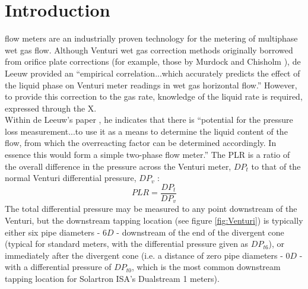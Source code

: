 \documentclass[journal]{IEEEtran}
\begin{document}






%



\section{Introduction}
 flow meters are an industrially proven technology for the metering of multiphase wet gas flow. Although Venturi wet gas correction methods originally borrowed from orifice plate corrections (for example, those by Murdock \cite{Murdock1962} and Chisholm \cite{Chisholm1977}), de Leeuw \cite{DeLeeuw1997} provided an ``empirical correlation...which accurately predicts the effect of the liquid phase on Venturi meter readings in wet gas horizontal flow.''  However, to provide this correction to the gas rate, knowledge of the liquid rate is required, expressed through the \acrfull{X}.\\

Within de Leeuw's paper \cite{DeLeeuw1997}, he indicates that there is ``potential for the pressure loss measurement...to use it as a means to determine the liquid content of the flow, from which the overreacting factor can be determined accordingly. In essence this would form a simple two-phase flow meter.''  The \acrlong{PLR} is a ratio of the overall difference in the pressure across the Venturi meter, $DP_{t}$ to that of the normal Venturi differential pressure, $DP_{v}$ :
\begin{equation}
    PLR = \frac{DP_{t}}{DP_{v}}
\end{equation}
The total differential pressure may be measured to any point downstream of the Venturi, but the downstream tapping location (see figure \ref{fig:Venturi}) is typically either six pipe diameters - $6D$ - downstream of the end of the divergent cone (typical for standard meters, with the differential pressure given as $DP_{t6}$), or immediately after the divergent cone (i.e. a distance of zero pipe diameters - $0D$ - with a differential pressure of $DP_{t0}$, which is the most common downstream tapping location for Solartron ISA's Dualstream 1 meters).
\end{document}
